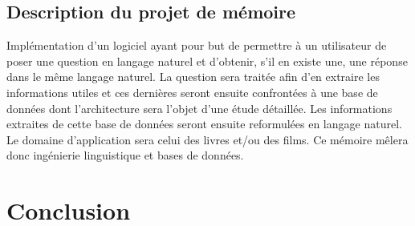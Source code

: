 \documentclass[12pt]{article}
\begin{document}
\subsection{Description du projet de mémoire}
Implémentation d’un logiciel ayant pour but de permettre  à un utilisateur de poser une question en langage naturel et d’obtenir, s’il en existe une, une réponse dans le même langage naturel. La question sera traitée afin d’en extraire les informations utiles et ces dernières seront ensuite confrontées à une base de données dont l’architecture sera l’objet d’une étude détaillée. Les informations extraites de cette base de données seront ensuite reformulées en langage naturel. Le domaine d’application sera celui des livres et/ou des films. Ce mémoire mêlera donc ingénierie linguistique et bases de données.

\section{Conclusion}

\newpage
\nocite{*}
\printbibliography
\end{document}
